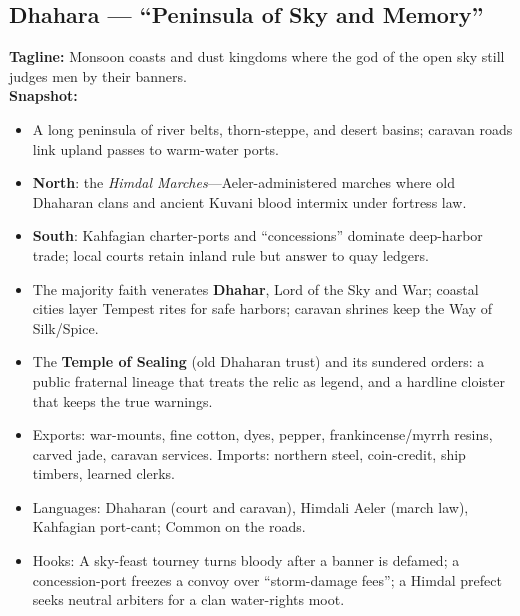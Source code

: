 \documentclass[11pt]{article}
\begin{document}
\subsection*{Dhahara — “Peninsula of Sky and Memory”}
\textbf{Tagline:} Monsoon coasts and dust kingdoms where the god of the open sky still judges men by their banners.\\
\textbf{Snapshot:}
\begin{itemize}
  \item A long peninsula of river belts, thorn-steppe, and desert basins; caravan roads link upland passes to warm-water ports.
  \item \textbf{North}: the \emph{Himdal Marches}—Aeler-administered marches where old Dhaharan clans and ancient Kuvani blood intermix under fortress law. 
  \item \textbf{South}: Kahfagian charter-ports and “concessions” dominate deep-harbor trade; local courts retain inland rule but answer to quay ledgers.
  \item The majority faith venerates \textbf{Dhahar}, Lord of the Sky and War; coastal cities layer Tempest rites for safe harbors; caravan shrines keep the Way of Silk/Spice.
  \item The \textbf{Temple of Sealing} (old Dhaharan trust) and its sundered orders: a public fraternal lineage that treats the relic as legend, and a hardline cloister that keeps the true warnings.
  \item Exports: war-mounts, fine cotton, dyes, pepper, frankincense/myrrh resins, carved jade, caravan services. Imports: northern steel, coin-credit, ship timbers, learned clerks.
  \item Languages: Dhaharan (court and caravan), Himdali Aeler (march law), Kahfagian port-cant; Common on the roads.
  \item Hooks: A sky-feast tourney turns bloody after a banner is defamed; a concession-port freezes a convoy over “storm-damage fees”; a Himdal prefect seeks neutral arbiters for a clan water-rights moot.
\end{itemize}
\end{document}
